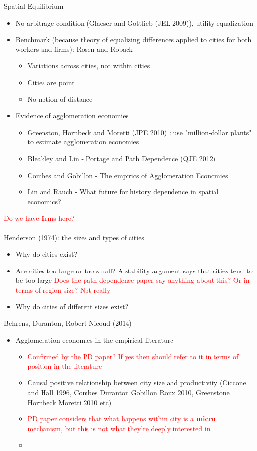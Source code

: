 \documentclass[10pt, final]{article}
\begin{document}
Spatial Equilibrium
\begin{itemize}
    \item No arbitrage condition (Glaeser and Gottlieb (JEL 2009)), utility equalization
    \item Benchmark (because theory of equalizing differences applied to cities for both workers and firms): Rosen and Roback 
    \begin{itemize}
        \item Variations across cities, not within cities
        \item Cities are point
        \item No notion of distance
    \end{itemize}
    \item Evidence of agglomeration economies
    \begin{itemize}
        \item Greenston, Hornbeck and Moretti (JPE 2010) : use "million-dollar plants" to estimate agglomeration economies
        \item Bleakley and Lin - Portage and Path Dependence (QJE 2012)
        \item Combes and Gobillon - The empirics of Agglomeration Economies
        \item Lin and Rauch - What future for history dependence in spatial economics?
    \end{itemize}
\end{itemize}


\textcolor{red}{Do we have firms here?}
\\
\\
Henderson (1974): the sizes and types of cities
\begin{itemize}
    \item Why do cities exist?
    \item Are cities too large or too small? A stability argument says that cities tend to be too large \textcolor{red}{Does the path dependence paper say anything about this? Or in terms of region size? Not really}
    \item Why do cities of different sizes exist?
\end{itemize}


Behrens, Duranton, Robert-Nicoud (2014)
\begin{itemize}
    \item Agglomeration economies in the empirical literature
    \begin{itemize}
        \item \textcolor{red}{Confirmed by the PD paper? If yes then should refer to it in terms of position in the literature}
        \item Causal positive relationship between city size and productivity (Ciccone and Hall 1996, Combes Duranton Gobillon Roux 2010, Greenstone Hornbeck Moretti 2010 etc)
        \item \textcolor{red}{PD paper considers that what happens within city is a \textbf{micro} mechanism, but this is not what they're deeply interested in}
        \item 
    \end{itemize}
\end{itemize}
\end{document}
